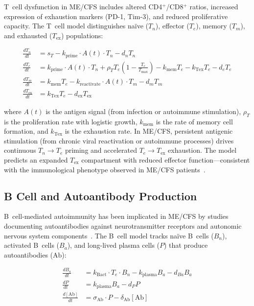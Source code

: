 T~cell dysfunction in ME/CFS includes altered CD4$^+$/CD8$^+$ ratios, increased expression of exhaustion markers (PD-1, Tim-3), and reduced proliferative capacity. The T~cell model distinguishes na\"ive ($T_n$), effector ($T_e$), memory ($T_m$), and exhausted ($T_{\text{ex}}$) populations:

\begin{align}
\label{eq:tcell-dynamics}
\frac{dT_n}{dt} &= s_T - k_{\text{prime}} \cdot A(t) \cdot T_n - d_n T_n \\
\frac{dT_e}{dt} &= k_{\text{prime}} \cdot A(t) \cdot T_n + \rho_T T_e \left(1 - \frac{T_e}{T_{\max}}\right) - k_{\text{mem}} T_e - k_{\text{Tex}} T_e - d_e T_e \\
\frac{dT_m}{dt} &= k_{\text{mem}} T_e - k_{\text{reactivate}} \cdot A(t) \cdot T_m - d_m T_m \\
\frac{dT_{\text{ex}}}{dt} &= k_{\text{Tex}} T_e - d_{\text{ex}} T_{\text{ex}}
\end{align}

where $A(t)$ is the antigen signal (from infection or autoimmune stimulation), $\rho_T$ is the proliferation rate with logistic growth, $k_{\text{mem}}$ is the rate of memory cell formation, and $k_{\text{Tex}}$ is the exhaustion rate. In ME/CFS, persistent antigenic stimulation (from chronic viral reactivation or autoimmune processes) drives continuous $T_n \to T_e$ priming and accelerated $T_e \to T_{\text{ex}}$ exhaustion. The model predicts an expanded $T_{\text{ex}}$ compartment with reduced effector function---consistent with the immunological phenotype observed in ME/CFS patients~\cite{Che2025}.

\subsection{B Cell and Autoantibody Production}
\label{sec:bcell-model}

B~cell-mediated autoimmunity has been implicated in ME/CFS by studies documenting autoantibodies against neurotransmitter receptors and autonomic nervous system components~\cite{Loebel2016,Sotzny2021,Bynke2020}. The B~cell model tracks na\"ive B~cells ($B_n$), activated B~cells ($B_a$), and long-lived plasma cells ($P$) that produce autoantibodies ($\text{Ab}$):

\begin{align}
\label{eq:bcell-dynamics}
\frac{dB_a}{dt} &= k_{\text{Bact}} \cdot T_e \cdot B_n - k_{\text{plasma}} B_a - d_{Ba} B_a \\
\frac{dP}{dt} &= k_{\text{plasma}} B_a - d_P P \\
\frac{d[\text{Ab}]}{dt} &= \sigma_{\text{Ab}} \cdot P - \delta_{\text{Ab}} [\text{Ab}]
\end{align}

